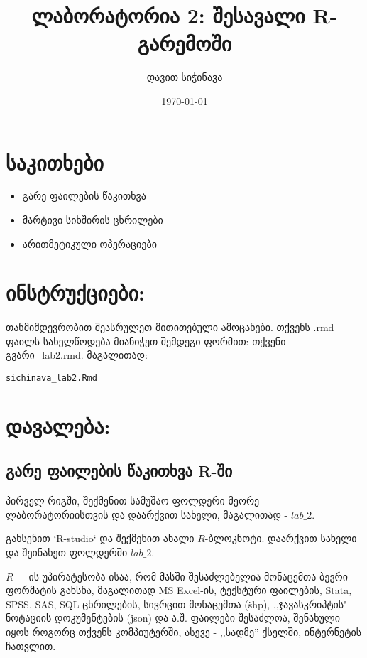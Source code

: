 \documentclass{article}\usepackage[]{graphicx}\usepackage[]{color}
\title{ლაბორატორია 2: შესავალი R-გარემოში}
\author{დავით სიჭინავა}
\date{\today}
\makeatletter
\newcommand{\hlstd}[1]{\textcolor[rgb]{0.345,0.345,0.345}{#1}}%
\newenvironment{kframe}{%
 \def\at@end@of@kframe{}%
 \ifinner\ifhmode%
  \def\at@end@of@kframe{\end{minipage}}%
  \begin{minipage}{\columnwidth}%
 \fi\fi%
 \def\FrameCommand##1{\hskip\@totalleftmargin \hskip-\fboxsep
 \colorbox{shadecolor}{##1}\hskip-\fboxsep
     \hskip-\linewidth \hskip-\@totalleftmargin \hskip\columnwidth}%
 \MakeFramed {\advance\hsize-\width
   \@totalleftmargin\z@ \linewidth\hsize
   \@setminipage}}%
 {\par\unskip\endMakeFramed%
 \at@end@of@kframe}
\newenvironment{knitrout}{}{} %
\makeatother
\begin{document}
\maketitle
\section*{საკითხები}
\begin{itemize}
\item გარე ფაილების წაკითხვა
\item მარტივი სიხშირის ცხრილები
\item არითმეტიკული ოპერაციები
\end{itemize}

\section*{ინსტრუქციები:}

\paragraph{}
თანმიმდევრობით შეასრულეთ მითითებული ამოცანები. თქვენს .rmd ფაილს სახელწოდება მიანიჭეთ შემდეგი ფორმით: თქვენი გვარი\_lab2.rmd. მაგალითად:

\begin{knitrout}
\color{fgcolor}\begin{kframe}
\begin{alltt}
\hlstd{sichinava_lab2.Rmd}
\end{alltt}
\end{kframe}
\end{knitrout}

\section*{დავალება:}

\subsection*{გარე ფაილების წაკითხვა R-ში}

პირველ რიგში, შექმენით სამუშაო ფოლდერი მეორე ლაბორატორიისთვის და დაარქვით სახელი, მაგალითად - $lab\_2$.

გახსენით `R-studio` და შექმენით ახალი $R$-ბლოკნოტი. დაარქვით სახელი და შეინახეთ ფოლდერში $lab\_2$. 

$R-$-ის უპირატესობა ისაა, რომ მასში შესაძლებელია მონაცემთა ბევრი ფორმატის გახსნა, მაგალითად  MS Excel-ის, ტექსტური ფაილების, Stata, SPSS, SAS, SQL ცხრილების, სივრცით მონაცემთა (\.shp), ,,ჯავასკრიპტის" ნოტაციის დოკუმენტების (\.json) და ა.შ. ფაილები შესაძლოა, შენახული იყოს როგორც თქვენს კომპიუტერში, ასევე - ,,სადმე'' ქსელში, ინტერნეტის ჩათვლით.
\end{document}
